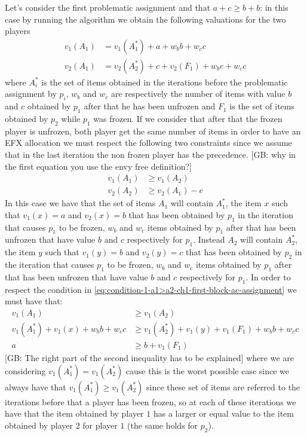 \documentclass{article}
\newcommand{\gb}[1]{{\color{red}[GB: #1]}}
\begin{document}
Let's consider the first problematic assignment and that $a + c \ge b + b$: in this case by running the algorithm we obtain the following valuations for the two players
\begin{align*}
    v_1(A_1) &= v_1(A_1^*) + a + w_b b + w_c c\\
    v_2(A_1) &= v_2(A_2^*) + c + v_2(F_1)+ w_b c + w_c c
\end{align*}
where $A_i^*$ is the set of items obtained in the iterations before the problematic assignment by $p_i$, $w_b$ and $w_c$ are respectively the number of items with value $b$ and $c$ obtained by $p_1$ after that he has been unfrozen and $F_1$ is the set of items obtained by $p_2$ while $p_1$ was frozen. If we consider that after that the frozen player is unfrozen, both player get the same number of items in order to have an EFX allocation we must respect the following two constraints since we assume that in the last iteration the non frozen player has the precedence. 
\gb{why in the first equation you use the envy free definition?}
\begin{align}
    v_1(A_1) &\ge v_1(A_2)\label{eq:condition-1-a1>a2-ch1-first-block-ac-assignment}\\
    v_2(A_2) &\ge v_2(A_1) - c\label{eq:condition-1-a2>a1-c-ch1-first-block-ac-assignment}
\end{align}
In this case we have that the set of items $A_1$ will contain $A_1^*$, the item $x$ such that $v_1(x) = a$ and $v_2(x) = b$ that has been obtained by $p_1$ in the iteration that causes $p_1$ to be frozen, $w_b$ and $w_c$ items obtained by $p_1$ after that has been unfrozen that have value $b$ and $c$ respectively for $p_1$. Instead $A_2$ will contain $A_2^*$, the item $y$ such that $v_1(y) = b$ and $v_2(y) = c$ that has been obtained by $p_2$ in the iteration that causes $p_1$ to be frozen, $w_b$ and $w_c$ items obtained by $p_1$ after that has been unfrozen that have value $b$ and $c$ respectively for $p_1$.
In order to respect the condition in \ref{eq:condition-1-a1>a2-ch1-first-block-ac-assignment} we must have that:
\begin{align*}
    v_1(A_1) &\ge v_1(A_2)\\
    v_1(A_1^*) + v_1(x) + w_b b + w_c c &\ge  v_1(A_2^*) + v_1(y) + v_1(F_1)+ w_b b + w_c c \\
    a  &\ge  b + v_1(F_1)
\end{align*}
\gb{The right part of the second inequality has to be explained}
where we are considering $v_1(A_1^*) = v_1(A_2^*)$ cause this is the worst possible case since we always have that $v_1(A_1^*) \ge v_1(A_2^*)$ since these set of items are referred to the iterations before that a player has been frozen, so at each of these iterations we have that the item obtained by player $1$ has a larger or equal value to the item obtained by player $2$ for player $1$ (the same holds for $p_2$).
\end{document}
